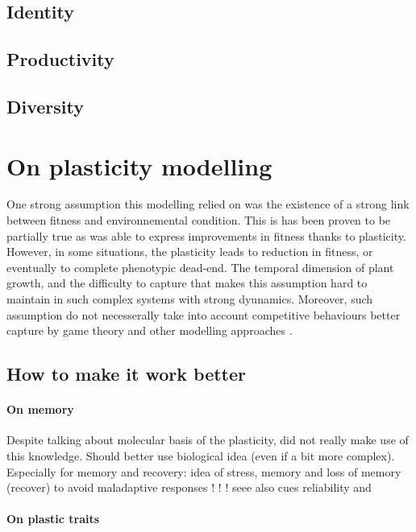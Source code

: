 \subsection{Identity}
\subsection{Productivity}
\subsection{Diversity}

\section{On plasticity modelling}
One strong assumption this modelling relied on was the existence of a strong link between fitness and environnemental condition. This is has been proven to be partially true as \model was able to express improvements in fitness thanks to plasticity. However, in some situations, the plasticity leads to reduction in fitness, or eventually to complete phenotypic dead-end. The temporal dimension of plant growth, and the difficulty to capture that makes this assumption hard to maintain in such complex systems with strong dyunamics. Moreover, such assumption do not necesserally take into account competitive behaviours better capture by game theory and other modelling approaches \cite{farrior_resource_2011, dybzinski_evolutionarily_2011}.

\subsection{How to make it work better}
\paragraph{On memory}

Despite talking about molecular basis of the plasticity, did not really make use of this knowledge. Should better use biological idea (even if a bit more complex). Especially for memory and recovery: idea of stress, memory and loss of memory (recover) to avoid maladaptive responses \parencite{crisp_reconsidering_2016} ! ! ! 
seee also cues reliability \parencite{simons_playing_2014} and \parencite{scheiner_genetics_1989, scheiner_genetics_2002, scheiner_genetics_2012, scheiner_genetics_2013}

\paragraph{On plastic traits}

